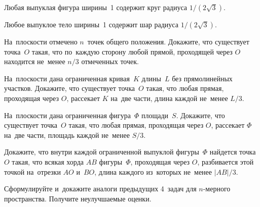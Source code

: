 \begin{problems}
\item{}
Любая выпуклая фигура ширины~1 содержит круг радиуса $1 / (2 \sqrt{3})$.

\item{}
Любое выпуклое тело ширины~1 содержит шар радиуса $1 / (2 \sqrt{3})$.

\item
На~плоскости отмечено $n$~точек общего положения.
Докажите, что существует точка~$O$ такая, что по~каждую сторону любой прямой,
проходящей через $O$ находится не~менее $n / 3$ отмеченных точек.

\item
На~плоскости дана ограниченная кривая~$K$ длины~$L$ без прямолинейных участков.
Докажите, что существует точка~$O$ такая, что любая прямая, проходящая
через $O$, рассекает $K$ на~две части, длина каждой не~менее $L / 3$.

\item
На~плоскости дана ограниченная фигура~$\Phi$ площади~$S$.
Докажите, что существует точка~$O$ такая, что любая прямая, проходящая
через $O$, рассекает $\Phi$ на~две части, площадь каждой не~менее $S / 3$.

\item
Докажите, что внутри каждой ограниченной выпуклой фигуры~$\Phi$ найдется
точка~$O$ такая, что всякая хорда $AB$ фигуры~$\Phi$, проходящая через $O$,
разбивается этой точкой на~отрезки $AO$ и~$BO$, длина каждого из~которых
не~менее $|AB| / 3$.

\item
Сформулируйте и~докажите аналоги предыдущих 4~задач для $n$-мерного
пространства.
Получите неулучшаемые оценки.

\end{problems}

